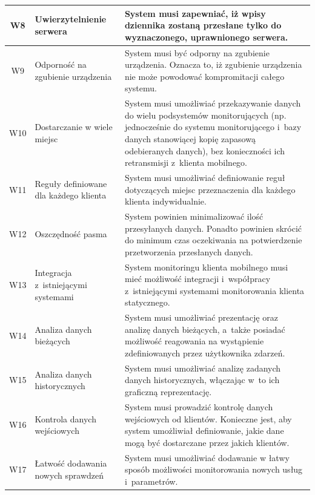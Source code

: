 \begin{longtable}[c]{|c||p{3.5cm}|p{9cm}|}
  W8 & \raggedright{Uwierzytelnienie serwera} & \raggedright{System musi zapewniać, iż wpisy dziennika zostaną przesłane tylko do wyznaczonego, uprawnionego serwera.} \tabularnewline
  \hline

  W9 & \raggedright{Odporność na zgubienie urządzenia} & \raggedright{System musi być odporny na zgubienie urządzenia. Oznacza to, iż zgubienie urządzenia nie może powodować kompromitacji całego systemu.} \tabularnewline
  \hline

  W10 & \raggedright{Dostarczanie w wiele miejsc} &
  \raggedright{System musi umożliwiać przekazywanie danych do wielu
    podsystemów monitorujących (np. jednocześnie do systemu
    monitorującego i~bazy danych stanowiącej kopię zapasową
    odebieranych danych), bez konieczności ich retransmisji z~klienta
    mobilnego.} \tabularnewline \hline

  W11 & \raggedright{Reguły definiowane dla każdego klienta} & \raggedright{System musi umożliwiać definiowanie reguł dotyczących miejsc przeznaczenia dla każdego klienta indywidualnie.} \tabularnewline
  \hline

  W12 & \raggedright{Oszczędność pasma} & \raggedright{System powinien minimalizować ilość przesyłanych danych. Ponadto powinien skrócić do minimum czas oczekiwania na potwierdzenie przetworzenia przesłanych danych.} \tabularnewline
  \hline

  W13 & \raggedright{Integracja z~istniejącymi systemami} & \raggedright{System monitoringu klienta mobilnego musi mieć możliwość integracji i~współpracy z~istniejącymi systemami monitorowania klienta statycznego.} \tabularnewline
  \hline

  W14 & \raggedright{Analiza danych bieżących} & \raggedright{System musi umożliwiać prezentację oraz analizę danych bieżących, a~także posiadać możliwość reagowania na wystąpienie zdefiniowanych przez użytkownika zdarzeń.} \tabularnewline
  \hline

  W15 & \raggedright{Analiza danych historycznych} & \raggedright{System musi umożliwiać analizę zadanych danych historycznych, włączając w~to ich graficzną reprezentację.} \tabularnewline
  \hline

  W16 & \raggedright{Kontrola danych wejściowych} & \raggedright{System musi prowadzić kontrolę danych wejściowych od klientów. Konieczne jest, aby system umożliwiał definiowanie, jakie dane mogą być dostarczane przez jakich klientów.} \tabularnewline
  \hline

  W17 & \raggedright{Łatwość dodawania nowych sprawdzeń} & \raggedright{System musi umożliwiać dodawanie w łatwy sposób możliwości monitorowania nowych usług i~parametrów.} \tabularnewline
  \hline


\end{longtable}
